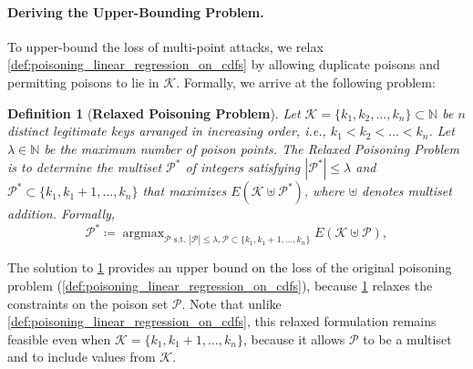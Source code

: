 \documentclass[acmsmall]{acmart}
\newtheorem{definition}{Definition}
\DeclareMathOperator*{\argmax}{argmax}
\begin{document}
\paragraph{Deriving the Upper-Bounding Problem.}
To upper-bound the loss of multi-point attacks, we relax \cref{def:poisoning_linear_regression_on_cdfs} by allowing duplicate poisons and permitting poisons to lie in $\mathcal{K}$.
Formally, we arrive at the following problem:
\begin{definition_box}
\begin{definition}[\textbf{Relaxed Poisoning Problem}]
\label{def:relaxed_poisoning_problem}
Let $\mathcal{K} = \{k_1, k_2, \dots, k_n\} \subset \mathbb{N}$ be $n$ distinct legitimate keys arranged in increasing order, i.e., $k_1 < k_2 < \dots < k_n$.
Let $\lambda \in \mathbb{N}$ be the maximum number of poison points.
The Relaxed Poisoning Problem is to determine the multiset $\mathcal{P}^\ast$ of integers satisfying $|\mathcal{P}^\ast| \leq \lambda$ and $\mathcal{P}^\ast\subset\{k_1,k_1+1,\dots,k_n\}$ that maximizes $E(\mathcal{K} \uplus \mathcal{P}^\ast)$, where $\uplus$ denotes multiset addition.
Formally,
\begin{equation}
    \mathcal{P}^\ast \coloneq \argmax_{\mathcal{P} \text{ s.t. } |\mathcal{P}| \leq \lambda, \mathcal{P}\subset\{k_1,k_1+1,\dots,k_n\}} E(\mathcal{K} \uplus \mathcal{P}),
\end{equation}
\end{definition}
\end{definition_box}
The solution to \cref{def:relaxed_poisoning_problem} provides an upper bound on the loss of the original poisoning problem (\cref{def:poisoning_linear_regression_on_cdfs}), because \cref{def:relaxed_poisoning_problem} relaxes the constraints on the poison set $\mathcal{P}$.
Note that unlike \cref{def:poisoning_linear_regression_on_cdfs}, this relaxed formulation remains feasible even when $\mathcal{K}=\{k_1,k_1+1,\dots,k_n\}$, because it allows $\mathcal{P}$ to be a multiset and to include values from $\mathcal{K}$.
\end{document}
